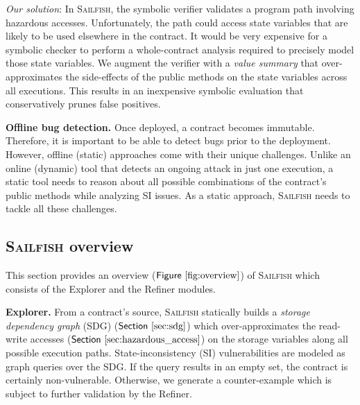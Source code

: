\documentclass[conference, romanappendices]{tex/IEEEtran}
\theoremstyle{bfnote}
\newcommand{\toolname}{\textsc{Sailfish}\xspace}
\newcommand{\explorer}{{\sc Explorer}\xspace}
\newcommand{\refiner}{{\sc Refiner}\xspace}
\newcommand{\sdg}{storage dependency graph\xspace}
\newcommand{\Fig}[1]{\ensuremath{\sf Figure~\ref{#1}}}
\newcommand{\Sect}[1]{\ensuremath{\sf Section~\ref{#1}}}
\begin{document}
\textit{Our solution}:
In \toolname, the symbolic verifier validates a program path involving hazardous accesses.
Unfortunately, the path could access state variables that are likely to be used elsewhere in the contract.
It would be very expensive for a symbolic checker to perform a whole-contract analysis required to precisely model
those state variables.
We augment the verifier with a \textit{value summary} that over-approximates the side-effects of the public methods on the state variables across all executions.
This results in an inexpensive symbolic evaluation that conservatively prunes false positives.

\noindent
\textbf{Offline bug detection.}
Once deployed, a contract becomes immutable.
Therefore, it is important to be able to detect bugs prior to the deployment.
However, offline (static) approaches come with their unique challenges.
Unlike an online (dynamic) tool that detects an ongoing attack in just one execution, a static tool needs to reason about all possible combinations of the contract's public methods while analyzing SI issues.
As a static approach, \toolname{} needs to tackle all these challenges.

\subsection{\textbf{\toolname overview}}
This section provides an overview (\Fig{fig:overview}) of \toolname which consists of the \explorer and the \refiner modules.


\noindent
\textbf{Explorer.}
From a contract's source, \toolname{} statically builds a \textit{\sdg} (SDG) (\Sect{sec:sdg}) which over-approximates the read-write accesses (\Sect{sec:hazardous_access}) on the storage variables along all possible execution paths.
State-inconsistency (SI) vulnerabilities are modeled as graph queries over the SDG.
If the query results in an empty set, the contract is certainly non-vulnerable.
Otherwise, we generate a counter-example which is subject to further validation by the \refiner.
\end{document}
